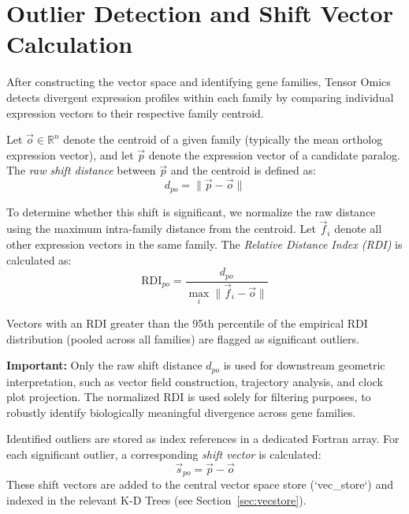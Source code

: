 \section{Outlier Detection and Shift Vector Calculation}\label{sec:outlier_detection}

    After constructing the vector space and identifying gene families, Tensor Omics detects divergent expression profiles within each family by comparing individual expression vectors to their respective family centroid.

    Let \( \vec{o} \in \mathbb{R}^n \) denote the centroid of a given family (typically the mean ortholog expression vector), and let \( \vec{p} \) denote the expression vector of a candidate paralog. The \emph{raw shift distance} between \( \vec{p} \) and the centroid is defined as:
    \[
        d_{po} = \| \vec{p} - \vec{o} \|
    \]

    To determine whether this shift is significant, we normalize the raw distance using the maximum intra-family distance from the centroid. Let \( \vec{f}_i \) denote all other expression vectors in the same family. The \emph{Relative Distance Index (RDI)} is calculated as:
    \[
        \text{RDI}_{po} = \frac{d_{po}}{\max_i \| \vec{f}_i - \vec{o} \|}
    \]

    Vectors with an RDI greater than the 95th percentile of the empirical RDI distribution (pooled across all families) are flagged as significant outliers.

    \textbf{Important:} Only the raw shift distance \( d_{po} \) is used for downstream geometric interpretation, such as vector field construction, trajectory analysis, and clock plot projection. The normalized RDI is used solely for filtering purposes, to robustly identify biologically meaningful divergence across gene families.

    Identified outliers are stored as index references in a dedicated Fortran array. For each significant outlier, a corresponding \emph{shift vector} is calculated:
    \[
        \vec{s}_{po} = \vec{p} - \vec{o}
    \]
    These shift vectors are added to the central vector space store (`vec\_store`)
    and indexed in the relevant K-D Trees (see Section~\ref{sec:vecstore}).